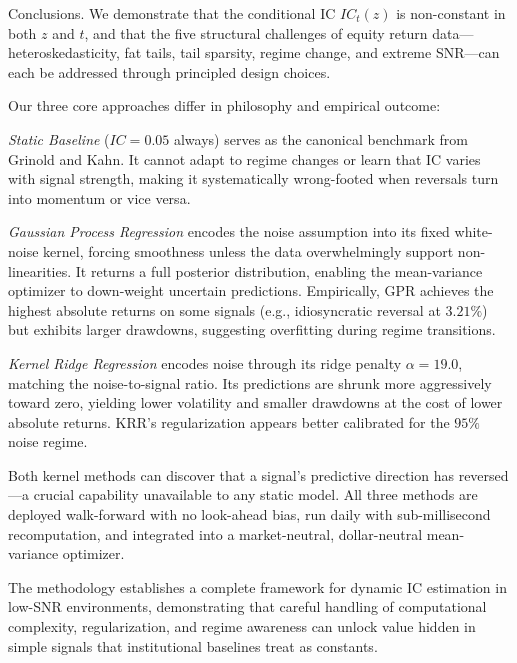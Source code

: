 \documentclass[11pt]{amsart}
\begin{document}
Conclusions.
We demonstrate that the conditional IC $IC_t(z)$ is non-constant in both
$z$ and $t$, and that the five structural challenges of equity return
data---heteroskedasticity, fat tails, tail sparsity, regime change, and
extreme SNR---can each be addressed through principled design choices.

Our three core approaches differ in philosophy and empirical outcome:

\emph{Static Baseline} ($IC = 0.05$ always) serves as the canonical benchmark
from Grinold and Kahn. It cannot adapt to regime changes or learn that IC
varies with signal strength, making it systematically wrong-footed when
reversals turn into momentum or vice versa.

\emph{Gaussian Process Regression} encodes the noise assumption into its fixed
white-noise kernel, forcing smoothness unless the data overwhelmingly support
non-linearities. It returns a full posterior distribution, enabling the
mean-variance optimizer to down-weight uncertain predictions. Empirically,
GPR achieves the highest absolute returns on some signals (e.g., idiosyncratic
reversal at $3.21\%$) but exhibits larger drawdowns, suggesting overfitting
during regime transitions.

\emph{Kernel Ridge Regression} encodes noise through its ridge penalty $\alpha = 19.0$,
matching the noise-to-signal ratio. Its predictions are shrunk more aggressively
toward zero, yielding lower volatility and smaller drawdowns at the cost of lower
absolute returns. KRR's regularization appears better calibrated for the $95\%$
noise regime.

Both kernel methods can discover that a signal's predictive direction has
reversed---a crucial capability unavailable to any static model. All three
methods are deployed walk-forward with no look-ahead bias, run daily with
sub-millisecond recomputation, and integrated into a market-neutral, dollar-neutral
mean-variance optimizer.

The methodology establishes a complete framework for dynamic IC estimation in
low-SNR environments, demonstrating that careful handling of computational
complexity, regularization, and regime awareness can unlock value hidden in
simple signals that institutional baselines treat as constants.

\FloatBarrier
\newpage
\end{document}
